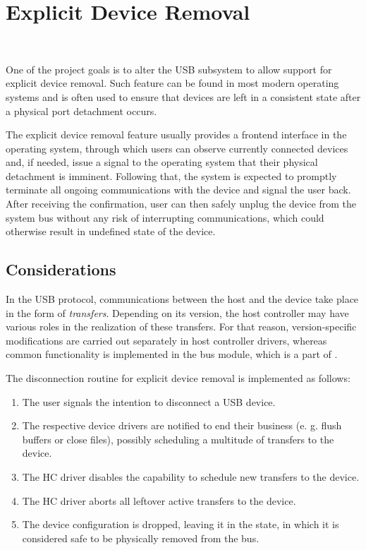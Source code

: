 \section{Explicit Device Removal}~\label{sec:offline}

One of the project goals is to alter the USB subsystem to allow support for
explicit device removal. Such feature can be found in most modern operating
systems and is often used to ensure that devices are left in a consistent state
after a physical port detachment occurs.

The explicit device removal feature usually provides a frontend interface in
the operating system, through which users can observe currently connected
devices and, if needed, issue a signal to the operating system that their
physical detachment is imminent. Following that, the system is expected to
promptly terminate all ongoing communications with the device and signal the
user back. After receiving the confirmation, user can then safely unplug the
device from the system bus without any risk of interrupting communications,
which could otherwise result in undefined state of the device.


\subsection{Considerations}

In the USB protocol, communications between the host and the device take place
in the form of \textit{transfers}. Depending on its version, the host controller
may have various roles in the realization of these transfers. For that reason,
version-specific modifications are carried out separately in host controller
drivers, whereas common functionality is implemented in the bus module, which is
a part of .

The disconnection routine for explicit device removal is implemented as follows:
%
\begin{enumerate}
	\item The user signals the intention to disconnect a USB device.
	\item The respective device drivers are notified to end their business (e.
		g. flush buffers or close files), possibly scheduling a multitude of
		transfers to the device.
	\item The HC driver disables the capability to schedule new transfers to the
		device.
	\item The HC driver aborts all leftover active transfers to the device.
	\item The device configuration is dropped, leaving it in the
		 state, in which it is considered safe to be
		physically removed from the bus.
\end{enumerate}

